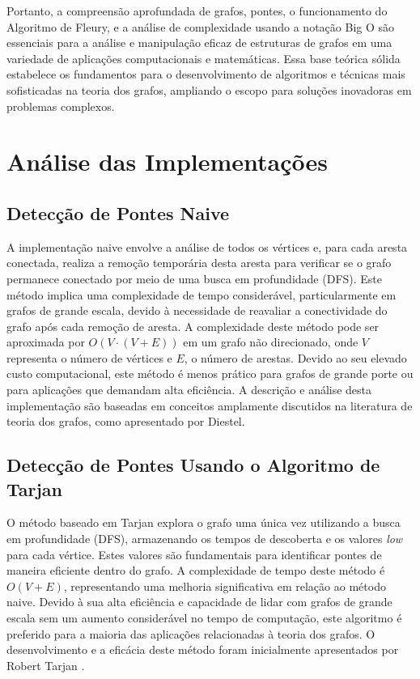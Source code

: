 \documentclass[12pt]{article}
\begin{document}
Portanto, a compreensão aprofundada de grafos, pontes, o funcionamento do Algoritmo de Fleury, e a análise de complexidade usando a notação Big O são essenciais para a análise e manipulação eficaz de estruturas de grafos em uma variedade de aplicações computacionais e matemáticas. Essa base teórica sólida estabelece os fundamentos para o desenvolvimento de algoritmos e técnicas mais sofisticadas na teoria dos grafos, ampliando o escopo para soluções inovadoras em problemas complexos.


\section{Análise das Implementações}

\subsection{Detecção de Pontes Naive}
A implementação naive envolve a análise de todos os vértices e, para cada aresta conectada, realiza a remoção temporária desta aresta para verificar se o grafo permanece conectado por meio de uma busca em profundidade (DFS). Este método implica uma complexidade de tempo considerável, particularmente em grafos de grande escala, devido à necessidade de reavaliar a conectividade do grafo após cada remoção de aresta. A complexidade deste método pode ser aproximada por $O(V \cdot (V+E))$ em um grafo não direcionado, onde $V$ representa o número de vértices e $E$, o número de arestas. Devido ao seu elevado custo computacional, este método é menos prático para grafos de grande porte ou para aplicações que demandam alta eficiência. A descrição e análise desta implementação são baseadas em conceitos amplamente discutidos na literatura de teoria dos grafos, como apresentado por Diestel\cite{diestelGraphTheory}.

\subsection{Detecção de Pontes Usando o Algoritmo de Tarjan}
O método baseado em Tarjan explora o grafo uma única vez utilizando a busca em profundidade (DFS), armazenando os tempos de descoberta e os valores \textit{low} para cada vértice. Estes valores são fundamentais para identificar pontes de maneira eficiente dentro do grafo. A complexidade de tempo deste método é $O(V+E)$, representando uma melhoria significativa em relação ao método naive. Devido à sua alta eficiência e capacidade de lidar com grafos de grande escala sem um aumento considerável no tempo de computação, este algoritmo é preferido para a maioria das aplicações relacionadas à teoria dos grafos. O desenvolvimento e a eficácia deste método foram inicialmente apresentados por Robert Tarjan \cite{tarjan1972depth}.
\end{document}
